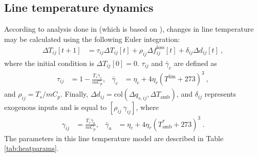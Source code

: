 \documentclass[conference]{IEEEtran}
\begin{document}

\subsection{Line temperature dynamics}
According to analysis done in \cite{almassalkhi2014} (which is based on \cite{ieee2007}), changes in line temperature may be calculated using the following Euler integration:
\begin{align}
\label{TD:euler}
\Delta T_{ij}[t+1] &= \tau_{ij}\Delta T_{ij}[t] + \rho_{ij}\Delta f_{ij}^\text{loss}[t] + \delta_{ij}\Delta d_{ij}[t]~,
\end{align}
where the initial condition is $\Delta T_{ij}[0] = 0$. $\tau_{ij}$ and $\bar{\gamma}_c$ are defined as
\begin{align}
\tau_{ij} &= 1 - \frac{T_s\bar{\gamma}_c}{mC_p},& \bar{\gamma}_c &= \eta_c + 4\eta_r(T^\text{lim} + 273)^3~,
\end{align}
and $\rho_{ij} = T_s/mC_p$. Finally, $\Delta d_{ij} = \text{col}(\Delta q_{s,ij},\Delta T_\text{amb})$, and $\delta_{ij}$ represents exogenous inputs and is equal to $[\rho_{ij}~\gamma_{ij}]$, where
\begin{align}
\gamma_{ij} &= \frac{T_s\bar{\gamma}_a}{mC_p}, & \bar{\gamma}_a &= \eta_c + 4\eta_r(T_\text{amb}^* + 273)^3~.
\end{align}
The parameters in this line temperature model are described in Table \ref{tab:heatparams}.
\end{document}
